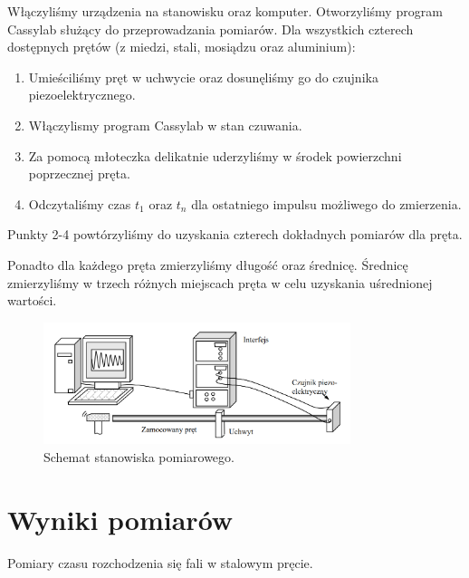 \documentclass[polish, a4paper]{article}
\begin{document}
Włączyliśmy urządzenia na stanowisku oraz komputer. Otworzyliśmy program Cassylab służący do przeprowadzania pomiarów.
Dla wszystkich czterech dostępnych prętów (z miedzi, stali, mosiądzu oraz aluminium):
\begin{enumerate}
\item{Umieściliśmy pręt w uchwycie oraz dosunęliśmy go do czujnika piezoelektrycznego.}
\item{Włączylismy program Cassylab w stan czuwania.}
\item{Za pomocą młoteczka delikatnie uderzyliśmy w środek powierzchni poprzecznej pręta.}
\item{Odczytaliśmy czas $t_1$ oraz $t_n$ dla ostatniego impulsu możliwego do zmierzenia.}
\end{enumerate}
Punkty 2-4 powtórzyliśmy do uzyskania czterech dokładnych pomiarów dla pręta.

Ponadto dla każdego pręta zmierzyliśmy długość oraz średnicę. 
Średnicę zmierzyliśmy w trzech różnych miejscach pręta w celu uzyskania uśrednionej wartości.

\begin{figure}[H]
\centering
\includegraphics[width=0.8\textwidth]{stanowisko.png}
\caption{Schemat stanowiska pomiarowego.}
\end{figure}

\section{Wyniki pomiarów}


\begin{table}[H]
    \centering
    \caption{Pomiary czasu rozchodzenia się fali w stalowym pręcie.}
\end{table}
\end{document}
